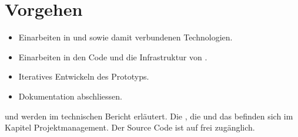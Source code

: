 \section{Vorgehen}
\begin{itemize}
	\item Einarbeiten in  und  sowie damit verbundenen Technologien.
	\item Einarbeiten in den Code und die Infrastruktur von \kort{}.
	\item Iteratives Entwickeln des Prototyps.
	\item Dokumentation abschliessen.
\end{itemize}

 und  werden im technischen Bericht erläutert.
Die , die  und das  befinden sich im Kapitel Projektmanagement. 
Der Source Code ist auf  frei zugänglich.
